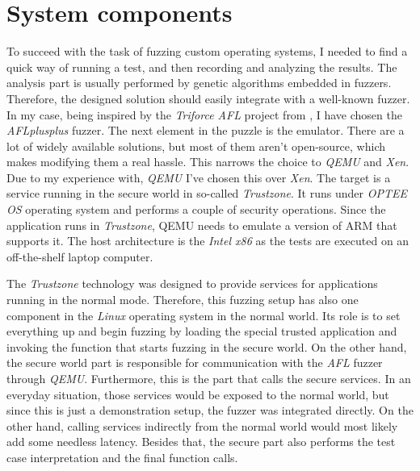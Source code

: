 \cleardoublepage
\section{System components} \label{chap:why}
To succeed with the task of fuzzing custom operating systems, I needed to find a quick way of running a test, and then recording and analyzing the results. The analysis part is usually performed by genetic algorithms embedded in fuzzers. Therefore, the designed solution should easily integrate with a well-known fuzzer. In my case, being inspired by the \textit{Triforce AFL} project from \cite{triforceafl}, I have chosen the \textit{AFLplusplus} fuzzer. The next element in the puzzle is the emulator. There are a lot of widely available solutions, but most of them aren't open-source, which makes modifying them a real hassle. This narrows the choice to \textit{QEMU} and \textit{Xen}. Due to my experience with, \textit{QEMU} I've chosen this over \textit{Xen}. The target is a service running in the secure world in so-called \textit{Trustzone}. It runs under \textit{OPTEE OS} operating system and performs a couple of security operations. Since the application runs in \textit{Trustzone}, QEMU needs to emulate a version of ARM that supports it. The host architecture is the \textit{Intel x86} as the tests are executed on an off-the-shelf laptop computer. 

The \textit{Trustzone} technology was designed to provide services for applications running in the normal mode. Therefore, this fuzzing setup has also one component in the \textit{Linux} operating system in the normal world. Its role is to set everything up and begin fuzzing by loading the special trusted application and invoking the function that starts fuzzing in the secure world. On the other hand, the secure world part is responsible for communication with the \textit{AFL} fuzzer through \textit{QEMU}. Furthermore, this is the part that calls the secure services. In an everyday situation, those services would be exposed to the normal world, but since this is just a demonstration setup, the fuzzer was integrated directly. On the other hand, calling services indirectly from the normal world would most likely add some needless latency. Besides that, the secure part also performs the test case interpretation and the final function calls. 

